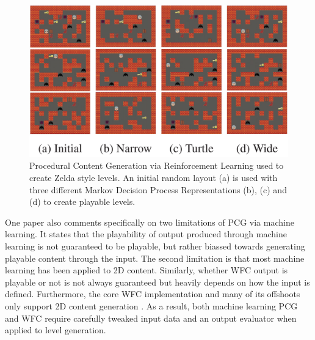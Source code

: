 \begin{figure}[H]
    \centering
    \includegraphics[width=\textwidth, height=0.3\textheight, keepaspectratio]{Images/PCGRL.jpg}
    \caption{Procedural Content Generation via Reinforcement Learning used to create Zelda style levels. An initial random layout (a) is used with three different Markov Decision Process Representations (b), (c) and (d) to create playable levels. \cite{Markov_PCGRL}}
    \label{fig:pcgrl}
\end{figure}

One paper \cite{PCGML} also comments specifically on two limitations of PCG via machine learning. It states that the playability of output produced through machine learning is not guaranteed to be playable, but rather biassed towards generating playable content through the input. The second limitation is that most machine learning has been applied to 2D content. Similarly, whether WFC output is playable or not is not always guaranteed but heavily depends on how the input is defined. Furthermore, the core WFC implementation and many of its offshoots only support 2D content generation \cite{Gumin_Wave_Function_Collapse_2016}. As a result, both machine learning PCG and WFC require carefully tweaked input data and an output evaluator when applied to level generation.

